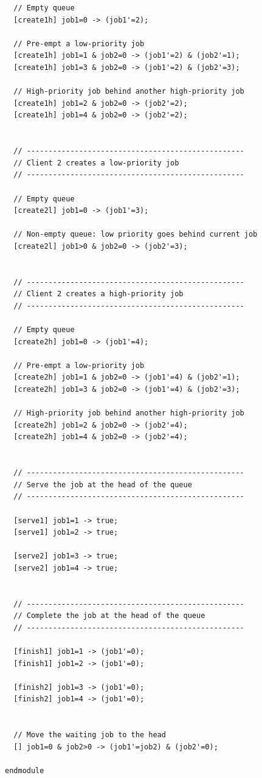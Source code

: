 \documentclass[12pt,a4paper]{article}
\begin{document}
\begin{description}
\begin{enumerate}[label=\alph*)]
\begin{lstlisting}
  // Empty queue
  [create1h] job1=0 -> (job1'=2);

  // Pre-empt a low-priority job
  [create1h] job1=1 & job2=0 -> (job1'=2) & (job2'=1);
  [create1h] job1=3 & job2=0 -> (job1'=2) & (job2'=3);

  // High-priority job behind another high-priority job
  [create1h] job1=2 & job2=0 -> (job2'=2);
  [create1h] job1=4 & job2=0 -> (job2'=2);


  // --------------------------------------------------
  // Client 2 creates a low-priority job
  // --------------------------------------------------

  // Empty queue
  [create2l] job1=0 -> (job1'=3);

  // Non-empty queue: low priority goes behind current job
  [create2l] job1>0 & job2=0 -> (job2'=3);


  // --------------------------------------------------
  // Client 2 creates a high-priority job
  // --------------------------------------------------

  // Empty queue
  [create2h] job1=0 -> (job1'=4);

  // Pre-empt a low-priority job
  [create2h] job1=1 & job2=0 -> (job1'=4) & (job2'=1);
  [create2h] job1=3 & job2=0 -> (job1'=4) & (job2'=3);

  // High-priority job behind another high-priority job
  [create2h] job1=2 & job2=0 -> (job2'=4);
  [create2h] job1=4 & job2=0 -> (job2'=4);


  // --------------------------------------------------
  // Serve the job at the head of the queue
  // --------------------------------------------------

  [serve1] job1=1 -> true;
  [serve1] job1=2 -> true;

  [serve2] job1=3 -> true;
  [serve2] job1=4 -> true;


  // --------------------------------------------------
  // Complete the job at the head of the queue
  // --------------------------------------------------

  [finish1] job1=1 -> (job1'=0);
  [finish1] job1=2 -> (job1'=0);

  [finish2] job1=3 -> (job1'=0);
  [finish2] job1=4 -> (job1'=0);


  // Move the waiting job to the head
  [] job1=0 & job2>0 -> (job1'=job2) & (job2'=0);

endmodule

\end{lstlisting}


\end{enumerate}
\end{description}
\end{document}
